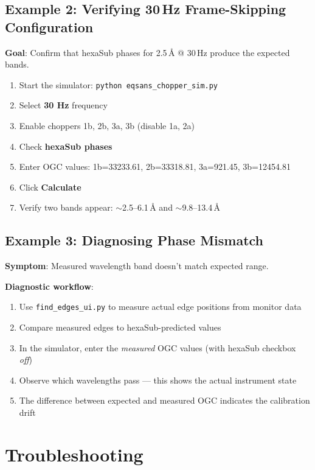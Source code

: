 \documentclass[11pt,letterpaper]{article}
\begin{document}
\subsection{Example 2: Verifying 30\,Hz Frame-Skipping Configuration}

\textbf{Goal}: Confirm that hexaSub phases for 2.5\,\AA{} @ 30\,Hz produce the expected bands.

\begin{enumerate}
    \item Start the simulator: \texttt{python eqsans\_chopper\_sim.py}
    \item Select \textbf{30 Hz} frequency
    \item Enable choppers 1b, 2b, 3a, 3b (disable 1a, 2a)
    \item Check \textbf{hexaSub phases}
    \item Enter OGC values: 1b=33233.61, 2b=33318.81, 3a=921.45, 3b=12454.81
    \item Click \textbf{Calculate}
    \item Verify two bands appear: $\sim$2.5--6.1\,\AA{} and $\sim$9.8--13.4\,\AA{}
\end{enumerate}

\subsection{Example 3: Diagnosing Phase Mismatch}

\textbf{Symptom}: Measured wavelength band doesn't match expected range.

\textbf{Diagnostic workflow}:
\begin{enumerate}
    \item Use \texttt{find\_edges\_ui.py} to measure actual edge positions from monitor data
    \item Compare measured edges to hexaSub-predicted values
    \item In the simulator, enter the \emph{measured} OGC values (with hexaSub checkbox \emph{off})
    \item Observe which wavelengths pass --- this shows the actual instrument state
    \item The difference between expected and measured OGC indicates the calibration drift
\end{enumerate}

\section{Troubleshooting}
\end{document}
